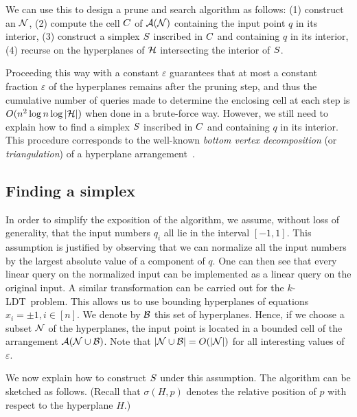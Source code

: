 We can use this to design a prune and search algorithm as follows:
(1) construct an \enet{} \(\mathcal{N}\),
(2) compute the cell \(C\) of \(\mathcal{A}(\mathcal{N})\) containing the input
point $q$ in its interior,
(3) construct a simplex \(S\) inscribed in \(C\) and containing
\(q\) in its interior,
(4) recurse on the hyperplanes of \(\mathcal{H}\) intersecting the interior of
\(S\).

Proceeding this way with a constant $\varepsilon$ guarantees that at most a
constant fraction \(\varepsilon\) of the hyperplanes remains after the pruning step,
and thus the cumulative number of queries made to determine the enclosing cell at
each step is $O(n^2 \log n \log |{\mathcal{H}}|)$ when done in a brute-force way.
However, we still need to explain how to find a simplex \(S\) inscribed
in \(C\) and containing \(q\) in its interior. This procedure corresponds to the well-known
\emph{bottom vertex decomposition} (or \emph{triangulation}) of a hyperplane
arrangement~\cite{GO04,Cla88}.

\subsection{Finding a simplex}

In order to simplify the exposition of the algorithm, we assume, without
loss of generality, that the input numbers $q_i$ all lie in the interval $[-1,1]$.
This assumption is justified by observing that we can normalize all the input
numbers by the largest absolute value of a component of $q$. One can then see that
every linear query on the normalized input can be implemented
as a linear query on the original input. A similar transformation can be carried out
for the \(k\)-LDT\ problem.
This allows us to use bounding hyperplanes of equations $x_i = \pm 1, i\in [n]$.
We denote by $\mathcal{B}$ this set of hyperplanes. Hence, if we choose a subset
\(\mathcal{N}\) of the hyperplanes, the input point is located in a bounded cell
of the arrangement \(\mathcal{A}(\mathcal{N} \cup \mathcal{B})\). Note that \(|{\mathcal{N} \cup
\mathcal{B}}| = O(|{\mathcal{N}}|)\) for all interesting values of \(\varepsilon\).

We now explain how to construct \(S\) under this assumption. The algorithm
can be sketched as follows. (Recall that $\sigma(H,p)$ denotes the relative position
of $p$ with respect to the hyperplane $H$.)

